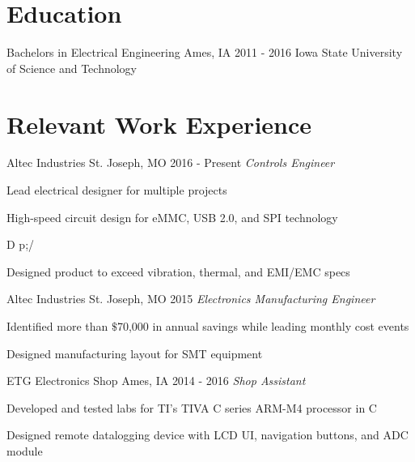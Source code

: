 \documentclass[]{bergman-cv} %
\begin{document}
\section{Education}
\begin{entrylist}
\entryFourItem
{Bachelors in Electrical Engineering}
{Ames, IA}
{2011 - 2016}
{Iowa State University of Science and Technology}
\end{entrylist}
\section{Relevant Work Experience}
\begin{entrylist}
\entry
{Altec Industries}
{St. Joseph, MO}
{2016 - Present}
{\emph{Controls Engineer}}
{\begin{itemizenosep}
	\item Lead electrical designer for multiple projects
	\item High-speed circuit design for eMMC, USB 2.0, and SPI technology
	\item D p;/
	\item Designed product to exceed vibration, thermal, and EMI/EMC specs
	\item 
\end{itemizenosep}}
\entry
{Altec Industries}
{St. Joseph, MO}
{2015}
{\emph{Electronics Manufacturing Engineer}}
{\begin{itemizenosep}
	\item Identified more than $\$$70,000 in annual savings while leading monthly cost events
	\item Designed manufacturing layout for SMT equipment
\end{itemizenosep}}
\entry
{ETG Electronics Shop}
{Ames, IA}
{2014 - 2016}
{\emph{Shop Assistant}}
{\begin{itemizenosep}
	\item Developed and tested labs for TI's TIVA C series ARM-M4 processor in C
	\item Designed remote datalogging device with LCD UI, navigation buttons, and ADC module
\end{itemizenosep}}
\end{entrylist}
\end{document}
